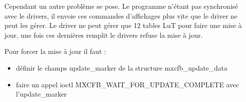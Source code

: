 Cependant un autre problème se pose. Le programme n'étant pas synchronisé avec le drivers, il envoie ces commandes d'affichages plus vite que le driver ne peut les gérer.
Le driver ne peut gérer que 12 tables LuT pour faire une mise à jour, une fois ces dernières remplit le drivers refuse la mise à jour.

Pour forcer la mise à jour il faut :
\begin{itemize}
	\item définir le champs update_marker de la structure mxcfb_update_data
	\item faire un appel ioctl MXCFB_WAIT_FOR_UPDATE_COMPLETE avec l'update_marker
\end{itemize}
